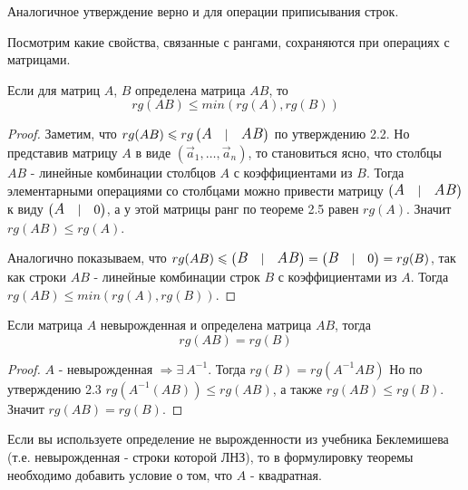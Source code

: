 \begin{note}
    Аналогичное утверждение верно и для операции приписывания строк.
\end{note}
Посмотрим какие свойства, связанные с рангами, сохраняются при операциях с матрицами.
\begin{proposition}
\label{rgleq}
    Если для матриц $A$, $B$ определена матрица $AB$, то $$rg(AB) \leqslant min(rg(A), rg(B))$$
\end{proposition}
\begin{proof}
    Заметим, что $rg(AB)\leqslant rg\left( \begin{matrix} \text{\large \textit{A}} & |& \text{\large \textit{AB}} \end{matrix} \right) $ по утверждению 2.2. Но представив матрицу $A$ в виде $(\vec{a}_1, \dots, \vec{a}_n)$, то становиться ясно, что столбцы $AB$ - линейные комбинации столбцов $A$ с коэффициентами из $B$. Тогда элементарными операциями со столбцами можно привести матрицу $\left( \begin{matrix} \text{\large \textit{A}} & |& \text{\large \textit{AB}} \end{matrix} \right) $ к виду $\left( \begin{matrix} \text{\large \textit{A}} & |& 0\end{matrix} \right) $, а у этой матрицы ранг по теореме 2.5 равен $rg(A)$. Значит  $rg(AB)\leqslant rg(A)$.

    Аналогично показываем, что $rg(AB)\leqslant \left( \begin{matrix} \text{\large \textit{B}} & |& \text{\large \textit{AB}} \end{matrix} \right) = \left( \begin{matrix} \text{\large \textit{B}} & |& 0\end{matrix} \right) = rg(B)$, так как строки $AB$ - линейные комбинации строк $B$ с коэффициентами из $A$. Тогда $rg(AB) \leqslant min(rg(A), rg(B))$.
\end{proof}
\begin{proposition}
    Если матрица $A$ невырожденная и определена матрица $AB$, тогда $$rg(AB)=rg(B)$$
\end{proposition}
\begin{proof}
    $A$ - невырожденная $\Rightarrow \exists \ A^{-1}$. Тогда $rg(B)=rg(A^{-1}AB)$ Но по утверждению 2.3 $rg(A^{-1}(AB)) \leqslant rg(AB)$, а также $rg(AB) \leqslant rg(B)$. Значит $rg(AB)=rg(B)$.
\end{proof}
\begin{note}
    Если вы используете определение не вырожденности из учебника Беклемишева (т.е. невырожденная - строки которой ЛНЗ), то в формулировку теоремы необходимо добавить условие о том, что $A$ - квадратная.
\end{note}
